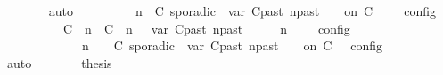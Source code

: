 \begin{isabellebody}
\ \ \ \ \ \ \isamarkupfalse%
\ auto\isanewline
\ \ \ \ \isamarkupfalse%
\ \isamarkupfalse%
\ {\isacartoucheopen}{\isasymlbrakk}\ {\isasymGamma}{\isacharcomma}\ n\ {\isasymTurnstile}\ {\isacharparenleft}{\isacharparenleft}C\ sporadic{\isasymsharp}\ {\isasymlparr}\ {\isasymtau}\isactrlsub v\isactrlsub a\isactrlsub r\ {\isacharparenleft}C\isactrlsub p\isactrlsub a\isactrlsub s\isactrlsub t{\isacharcomma}\ n\isactrlsub p\isactrlsub a\isactrlsub s\isactrlsub t{\isacharparenright}\ {\isasymoplus}\ {\isasymdelta}{\isasymtau}\ {\isasymrparr}\ on\ C\ {\isacharhash}\ {\isasymPsi}{\isacharparenright}\ {\isasymtriangleright}\ {\isasymPhi}\ {\isasymrbrakk}\isactrlsub c\isactrlsub o\isactrlsub n\isactrlsub f\isactrlsub i\isactrlsub g\isanewline
\ \ \ \ \ \ \ \ {\isacharequal}\ {\isasymlbrakk}\ {\isacharparenleft}{\isacharparenleft}C\ {\isasymUp}\ n{\isacharparenright}\ {\isacharhash}\ {\isacharparenleft}C\ {\isasymDown}\ n\ {\isacharat}{\isasymsharp}\ {\isasymlparr}\ {\isasymtau}\isactrlsub v\isactrlsub a\isactrlsub r\ {\isacharparenleft}C\isactrlsub p\isactrlsub a\isactrlsub s\isactrlsub t{\isacharcomma}\ n\isactrlsub p\isactrlsub a\isactrlsub s\isactrlsub t{\isacharparenright}\ {\isasymoplus}\ {\isasymdelta}{\isasymtau}\ {\isasymrparr}{\isacharparenright}\ {\isacharhash}\ {\isasymGamma}{\isacharparenright}{\isacharcomma}\ n\ {\isasymTurnstile}\ {\isasymPsi}\ {\isasymtriangleright}\ {\isasymPhi}\ {\isasymrbrakk}\isactrlsub c\isactrlsub o\isactrlsub n\isactrlsub f\isactrlsub i\isactrlsub g\isanewline
\ \ \ \ \ \ \ \ \ \ {\isasymunion}\ {\isasymlbrakk}\ {\isasymGamma}{\isacharcomma}\ n\ {\isasymTurnstile}\ {\isasymPsi}\ {\isasymtriangleright}\ {\isacharparenleft}{\isacharparenleft}C\ sporadic{\isasymsharp}\ {\isasymlparr}\ {\isasymtau}\isactrlsub v\isactrlsub a\isactrlsub r\ {\isacharparenleft}C\isactrlsub p\isactrlsub a\isactrlsub s\isactrlsub t{\isacharcomma}\ n\isactrlsub p\isactrlsub a\isactrlsub s\isactrlsub t{\isacharparenright}\ {\isasymoplus}\ {\isasymdelta}{\isasymtau}\ {\isasymrparr}\ on\ C\ {\isacharhash}\ {\isasymPhi}{\isacharparenright}\ {\isasymrbrakk}\isactrlsub c\isactrlsub o\isactrlsub n\isactrlsub f\isactrlsub i\isactrlsub g{\isacartoucheclose}\isanewline
\ \ \ \ \ \ \isamarkupfalse%
\ auto\isanewline
\ \ \ \ \isamarkupfalse%
\ \isamarkupfalse%
\ {\isacharquery}thesis\ \isamarkupfalse%

\end{isabellebody}
